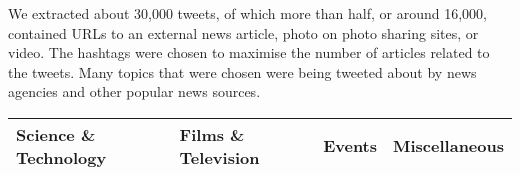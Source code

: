 We extracted about 30,000 tweets, of which more than half, or around 16,000, contained URLs to an external news article, photo on photo sharing sites, or video. The hashtags were chosen to maximise the number of articles related to the tweets. Many topics that were chosen were being tweeted about by news agencies and other popular news sources.


\begin{table}[!htbp]
\begin{tabular}{|l|l|l|l|}
\hline
Science \& Technology                                                                                                                               & Films \& Television                                                                                                                                                                              & Events                                                                                                                                                                         & Miscellaneous                                                                                                                                                                                                                                                 \\ \hline

\end{tabular}
\end{table}
